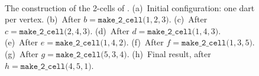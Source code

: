 \begin{figure}[tb]
 \quad
{}\\
\caption[Constructing the 2-cells of ]{The construction of the 2-cells of . (a)~Initial configuration: one dart per vertex. (b)~After $b=\texttt{make\_2\_cell(}1,2,3\texttt{)}$. (c)~After $c=\texttt{make\_2\_cell(}2,4,3\texttt{)}$. (d)~After $d=\texttt{make\_2\_cell(}1,4,3\texttt{)}$. (e)~After $e=\texttt{make\_2\_cell(}1,4,2\texttt{)}$. (f)~After $f=\texttt{make\_2\_cell(}1,3,5\texttt{)}$. (g)~After $g=\texttt{make\_2\_cell(}5,3,4\texttt{)}$. (h)~Final result, after $h=\texttt{make\_2\_cell(}4,5,1\texttt{)}$.}
\label{fig:reconstruction-2}
\end{figure}

